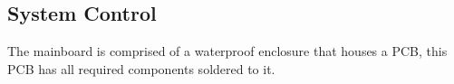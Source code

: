 \subsection{System Control}

The mainboard is comprised of a waterproof enclosure that houses a PCB, this PCB has all required components soldered to it. 